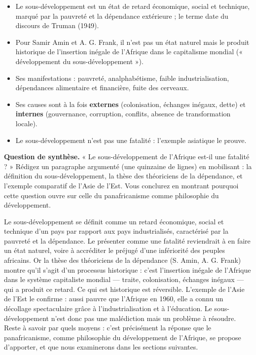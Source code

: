 \documentclass[11pt]{article}
\newcommand{\cle}[1]{{\popxbold\color{popdark}#1}}
\begin{document}
\begin{aretenir}
\begin{itemize}
\item Le \cle{sous-développement} est un état de retard économique, social et technique, marqué par la pauvreté et la dépendance extérieure ; le terme date du discours de Truman (1949).
\item Pour Samir Amin et A. G. Frank, il n'est pas un état naturel mais le produit historique de l'insertion inégale de l'Afrique dans le capitalisme mondial (« développement du sous-développement »).
\item Ses manifestations : pauvreté, analphabétisme, faible industrialisation, dépendances alimentaire et financière, fuite des cerveaux.
\item Ses causes sont à la fois \textbf{externes} (colonisation, échanges inégaux, dette) et \textbf{internes} (gouvernance, corruption, conflits, absence de transformation locale).
\item Le sous-développement n'est pas une fatalité : l'exemple asiatique le prouve.
\end{itemize}
\end{aretenir}

\begin{exercice}
\textbf{Question de synthèse.} « Le sous-développement de l'Afrique est-il une fatalité ? » Rédigez un paragraphe argumenté (une quinzaine de lignes) en mobilisant : la définition du sous-développement, la thèse des théoriciens de la dépendance, et l'exemple comparatif de l'Asie de l'Est. Vous conclurez en montrant pourquoi cette question ouvre sur celle du panafricanisme comme philosophie du développement.
\end{exercice}

\begin{corrige}[Exercice]
Le sous-développement se définit comme un retard économique, social et technique d'un pays par rapport aux pays industrialisés, caractérisé par la pauvreté et la dépendance. Le présenter comme une fatalité reviendrait à en faire un état naturel, voire à accréditer le préjugé d'une infériorité des peuples africains. Or la thèse des théoriciens de la dépendance (S. Amin, A. G. Frank) montre qu'il s'agit d'un processus historique : c'est l'insertion inégale de l'Afrique dans le système capitaliste mondial — traite, colonisation, échanges inégaux — qui a produit ce retard. Ce qui est historique est réversible. L'exemple de l'Asie de l'Est le confirme : aussi pauvre que l'Afrique en 1960, elle a connu un décollage spectaculaire grâce à l'industrialisation et à l'éducation. Le sous-développement n'est donc pas une malédiction mais un problème à résoudre. Reste à savoir par quels moyens : c'est précisément la réponse que le panafricanisme, comme philosophie du développement de l'Afrique, se propose d'apporter, et que nous examinerons dans les sections suivantes.
\end{corrige}
\end{document}
